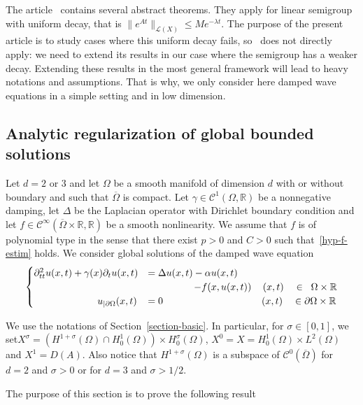 \documentclass[AHL,Unicode,longabstracts]{cedram}
\newcommand{\RR}{\mathbb{R}}
\newcommand{\Cc}{\mathcal{C}}
\newcommand{\Lc}{\mathcal{L}}
\begin{document}
The article~\cite{Hale-Raugel} contains several abstract theorems. They apply for linear semigroup with uniform decay, that is $\|e^{At}\|_{\Lc(X)}\leq M e^{-\lambda t}$. The purpose of the present article is to study cases where this uniform decay fails, so~\cite{Hale-Raugel} does not directly apply: we need to extend its results in our case where the semigroup has a weaker decay. Extending these results in the most general framework will lead to heavy notations and assumptions. That is why, we only consider here damped wave equations in a simple setting and in low dimension.

\subsection{Analytic regularization of global bounded solutions}
Let $d=2$ or $3$ and let $\Omega$ be a smooth manifold of dimension $d$ with or without boundary and such that $\overline\Omega$ is compact. Let $\gamma\in \Cc^1(\Omega,\RR)$ be a nonnegative damping, let $\Delta$ be the Laplacian operator with Dirichlet boundary condition and let $f\in\Cc^\infty(\overline\Omega\times\RR,\RR)$ be a smooth nonlinearity. We assume that $f$ is of polynomial type in the sense that there exist $p>0$ and $C>0$ such that~\eqref{hyp-f-estim} holds. We consider global solutions of the damped wave equation
\begin{equation}\label{eq-analytic}
\begin{cases}
\partial_{tt}^2 u(x,t) + \gamma(x)\partial_t u(x,t) &= \Delta u(x,t) - \alpha u(x,t)\\
& \mkern 85mu - f(x,u(x,t))\quad\,(x,t)\quad\in\;\;\Omega\times \RR\\
\mkern117mu u_{|\partial\Omega}(x,t)&= 0\;\mkern177mu(x,t)\quad\in\partial\Omega\times \RR
\end{cases}
\end{equation}

We use the notations of Section~\ref{section-basic}. In particular, for $\sigma\in[0,1]$, we set\linebreak$X^{\sigma}=(H^{1+\sigma}(\Omega)\cap H^1_0(\Omega))\times H^{\sigma}_0(\Omega)$, $X^0=X=H^1_0(\Omega)\times L^2(\Omega)$ and $X^1=D(A)$. Also notice that $H^{1+\sigma}(\Omega)$ is a subspace of $\Cc^0(\overline\Omega)$ for $d=2$ and $\sigma>0$ or for $d=3$ and $\sigma>1/2$.

The purpose of this section is to prove the following result
\end{document}
